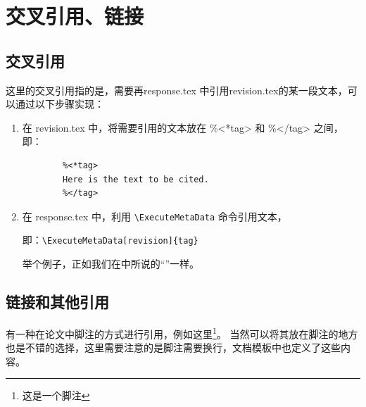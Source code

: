 \chapter{交叉引用、链接}
\section{交叉引用}
这里的交叉引用指的是，需要再response.tex 中引用revision.tex的某一段文本，可以通过以下步骤实现：

\begin{enumerate}[label=\arabic*]
    \item 在 revision.tex 中，将需要引用的文本放在 \%<*tag> 和 \%</tag> 之间，即：
          \begin{lstlisting}
        %<*tag>
        Here is the text to be cited.
        %</tag>
    \end{lstlisting}
    \item 在 response.tex 中，利用 \verb|\ExecuteMetaData| 命令引用文本，

          即：\verb|\ExecuteMetaData[revision]{tag}|

          举个例子，正如我们在中所说的“”一样。
\end{enumerate}
\section{链接和其他引用}

有一种在论文中脚注的方式进行引用，例如这里\footnote{这是一个脚注}。
当然可以将其放在脚注的地方也是不错的选择，这里需要注意的是脚注需要换行，文档模板中也定义了这些内容。
